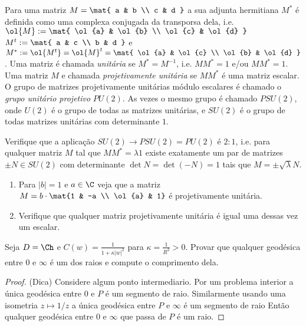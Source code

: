 \begin{defin}
Para uma matriz $M = \mat{ a & b \\ c & d }$ a sua adjunta hermitiana $M^*$ é definida como
uma complexa conjugada da transporsa dela, i.e. $\ol{M} := \mat{ \ol{a} & \ol{b} \\ \ol{c} & \ol{d} }$
$M^t := \mat{ a & c \\ b & d }$ e $M^* := \ol{M^t} = \ol{M}^t = \mat{ \ol{a} & \ol{c} \\ \ol{b} & \ol{d} }$.
Uma matriz é chamada \emph{unitária} se $M^* = M^{-1}$, i.e. $M M^* = 1$ e/ou $M M^* = 1$.
Uma matriz $M$ e chamada \emph{projetivamente unitária} se $M M^*$ é uma matriz escalar.
O grupo de matrizes projetivamente unitárias módulo escalares é chamado o \emph{grupo unitário projetivo} $PU(2)$.
As vezes o mesmo grupo é chamado $PSU(2)$, onde $U(2)$ é o grupo de todas as matrizes unitárias,
e $SU(2)$ é o grupo de todas matrizes unitárias com determinante $1$.
\end{defin}
\begin{problema}
Verifique que a aplicação $SU(2) \to PSU(2) = PU(2)$ é $2:1$,
i.e. para qualquer matriz $M$ tal que $M M^* = \lambda 1$ existe exatamente um par de matrizes $\pm N \in SU(2)$
com determinante $\det N = \det (-N) = 1$ tais que $M = \pm \sqrt{\lambda} N$.
\end{problema}
\begin{problema}
\begin{enumerate}
\item Para $|b|=1$ e $a\in\C$ veja que a matriz $M = b\cdot \mat{1 & -a \\ \ol{a} & 1}$ é projetivamente unitária.
\item Verifique que qualquer matriz projetivamente unitária é igual uma dessas vez um escalar.
\end{enumerate}
\end{problema}

\begin{problema}
Seja $D = \Ch$ e $C(w) = \frac{1}{1+\kappa|w|^2}$ para $\kappa = \frac{1}{R^2} > 0$.
Provar que qualquer geodésica entre $0$ e $\infty$ é um dos raios e compute o comprimento dela.
\end{problema}
\begin{proof}
(Dica) Considere algum ponto intermediario. Por um problema interior a única geodésica entre $0$ e $P$ é um segmento de raio.
Similarmente usando uma isometria $z\mapsto 1/z$ a única geodésica entre $P$ e $\infty$ é um segmento de raio
Então qualquer geodésica entre $0$ e $\infty$ que passa de $P$ é um raio.
\end{proof}

